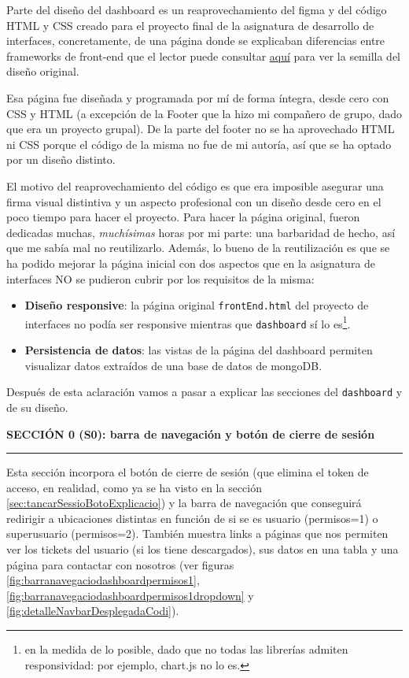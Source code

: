 \documentclass[a4paper,12pt]{report}
\begin{document}
	Parte del diseño del dashboard es un reaprovechamiento del figma y del código HTML y CSS creado para el proyecto final de la asignatura de desarrollo de interfaces, concretamente, de una página donde se explicaban diferencias entre frameworks de front-end que el lector puede consultar  	\href{https://blackcub3s.github.io/proyectoDesarrolloInterfaces/FrontEnd.html}{aquí} para ver la semilla del diseño original.
	
	Esa página fue diseñada y programada por mí de forma íntegra, desde cero con CSS y HTML (a excepción de la Footer que la hizo mi compañero de grupo, dado que era un proyecto grupal). De la parte del footer no se ha aprovechado HTML ni CSS porque el código de la misma no fue de mi autoría, así que se ha optado por un diseño distinto.
	
	El motivo del reaprovechamiento del código es que era imposible asegurar una firma visual distintiva y un aspecto profesional con un diseño desde cero en el poco tiempo para hacer el proyecto. Para hacer la página original, fueron dedicadas muchas, \textit{muchísimas} horas por mi parte: una barbaridad de hecho, así que me sabía mal no reutilizarlo. Además, lo bueno de la reutilización es que se ha podido mejorar la página inicial con dos aspectos que en la asignatura de interfaces NO se pudieron cubrir por los requisitos de la misma:
	
	\vspace{-.8em}
	\begin{itemize}
		\setlength{\itemsep}{-.2em}
		\item \textbf{Diseño responsive}: la página original \texttt{frontEnd.html} del proyecto de interfaces no podía ser responsive mientras que \texttt{dashboard} sí lo es\footnote{en la medida de lo posible, dado que no todas las librerías admiten responsividad: por ejemplo, chart.js no lo es.}.
		\item \textbf{Persistencia de datos}: las vistas de la página del dashboard permiten visualizar datos extraídos de una base de datos de mongoDB.
	\end{itemize}
	
	\noindent Después de esta aclaración vamos a pasar a explicar las secciones del \texttt{dashboard} y de su diseño.
	
	
	
	\noindent \textbf{SECCIÓN 0 (S0): barra de navegación y botón de cierre de sesión}
	\hrule
	\vspace{.5em}
	
	Esta sección incorpora el botón de cierre de sesión (que elimina el token de acceso, en realidad, como ya se ha visto en la sección \ref{sec:tancarSessioBotoExplicacio}) y la barra de navegación que conseguirá redirigir a ubicaciones distintas en función de si se es usuario (permisos=1) o superusuario (permisos=2). También muestra links a páginas que nos permiten ver los tickets del usuario (si los tiene descargados), sus datos en una tabla y una página para contactar con nosotros (ver figuras \ref{fig:barranavegaciodashboardpermisos1}, \ref{fig:barranavegaciodashboardpermisos1dropdown} y \ref{fig:detalleNavbarDesplegadaCodi}).
	
\end{document}
